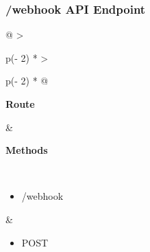 
\subsubsection{/webhook API Endpoint}

\begin{longtable}[]{@{}
    >{\raggedright\arraybackslash}p{(\columnwidth - 2\tabcolsep) * }
    >{\raggedright\arraybackslash}p{(\columnwidth - 2\tabcolsep) * }@{}}
\toprule
\begin{minipage}[b]{\linewidth}\raggedright
\textbf{Route}
\end{minipage} & \begin{minipage}[b]{\linewidth}\raggedright
\textbf{Methods}
\end{minipage} \\
\midrule
\endhead
\begin{itemize}
    \item /webhook
\end{itemize} &
\begin{itemize}
    \item POST
\end{itemize} \\
\bottomrule
\end{longtable}


